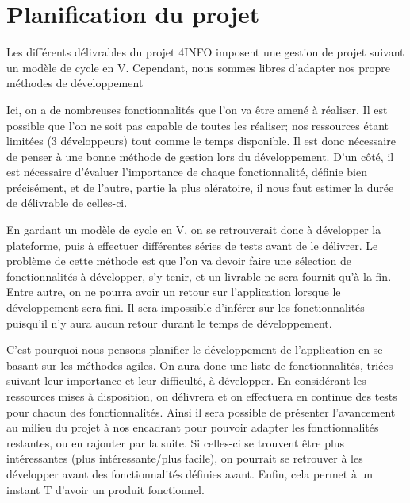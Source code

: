 \section{Planification du projet}
\label{sec:orga}

	Les différents délivrables du projet 4INFO imposent une gestion de projet suivant un modèle de cycle en V. Cependant, nous sommes libres d'adapter nos propre méthodes de développement 

	Ici, on a de nombreuses fonctionnalités que l'on va être amené à réaliser. Il est possible que l'on ne soit pas capable de toutes les réaliser; nos ressources étant limitées (3 développeurs) tout comme le temps disponible. Il est donc nécessaire de penser à une bonne méthode de gestion lors du développement. D'un côté, il est nécessaire d'évaluer l'importance de chaque fonctionnalité, définie bien précisément, et de l'autre, partie la plus alératoire, il nous faut estimer la durée de délivrable de celles-ci.

	En gardant un modèle de cycle en V, on se retrouverait donc à développer la plateforme, puis à effectuer différentes séries de tests avant de le délivrer. Le problème de cette méthode est que l'on va devoir faire une sélection de fonctionnalités à développer, s'y tenir, et un livrable ne sera fournit qu'à la fin. Entre autre, on ne pourra avoir un retour sur l'application lorsque le développement sera fini. Il sera impossible d'inférer sur les fonctionnalités puisqu'il n'y aura aucun retour durant le temps de développement. 

	C'est pourquoi nous pensons planifier le développement de l'application en se basant sur les méthodes agiles. On aura donc une liste de fonctionnalités, triées suivant leur importance et leur difficulté, à développer. En considérant les ressources mises à disposition, on délivrera et on effectuera en continue des tests pour chacun des fonctionnalités. Ainsi il sera possible de présenter l'avancement au milieu du projet à nos encadrant pour pouvoir adapter les fonctionnalités restantes, ou en rajouter par la suite. Si celles-ci se trouvent être plus intéressantes (plus intéressante/plus facile), on pourrait se retrouver à les développer avant des fonctionnalités définies avant. Enfin, cela permet à un instant T d'avoir un produit fonctionnel.